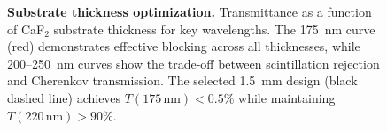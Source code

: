 \documentclass{aastex701}
\begin{document}
\begin{figure}[htbp]
    \caption{\textbf{Substrate thickness optimization.} Transmittance as a function of CaF$_2$ substrate thickness for key wavelengths. The 175~nm curve (red) demonstrates effective blocking across all thicknesses, while 200--250~nm curves show the trade-off between scintillation rejection and Cherenkov transmission. The selected 1.5~mm design (black dashed line) achieves $T(175\,\text{nm}) < 0.5\%$ while maintaining $T(220\,\text{nm}) > 90\%$.}
    \label{fig:thickness_tradeoff}
\end{figure}
\end{document}
